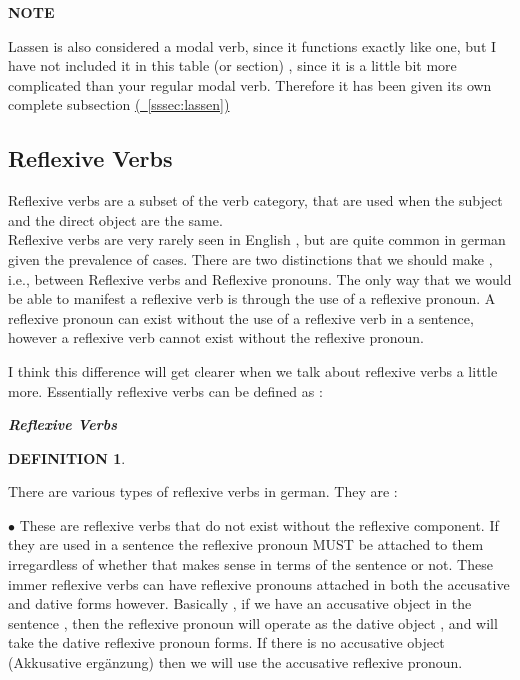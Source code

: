 \documentclass[a4paper,twocolumn,10pt]{article}
\newtheorem{mydef}{DEFINITION}[section]
\newcommand{\newpar}
{\par \vspace{0.3cm}}
\newcommand{\subsectionend}
{
\nolinenumbers
\linenumbers
}
\newcommand{\bulletpoint}
{ $\bullet$  }
\newcommand{\tcolorboxstart}
{
	\nolinenumbers
	\vspace{0.2cm}
	\centering
}
\newcommand{\tcolorboxend}
{
	\justifying
	\vspace{0.2cm}
	\linenumbers
}
\newcommand{\tcolorboxdefinition}[3]
{

\tcolorboxstart
\begin{defn-bg}

	\begin{defn-title}[width=7cm]{}
	{
		\normalsize \textbf{\textit{#1}}
	}
	\end{defn-title}

	\begin{defn-theword}
	{
		\footnotesize
		\begin{mydef} #2
		\end{mydef}
	}
	\end{defn-theword}


	\begin{defn-content}

	\justify
	#3

	\end{defn-content}

\end{defn-bg}
\tcolorboxend
}
\newcommand{\tcolorboxnote}[1]
{

\tcolorboxstart
\begin{note-bg}

	\begin{note-theword}
		{\footnotesize \textbf{NOTE} }
	\end{note-theword}

	\begin{note-content} \justifying

		#1

	\end{note-content}

\end{note-bg}
\tcolorboxend
}
\newcommand{\refsssec}[1]
{
	\hyperref[sec:#1]
	{
		(\textsection~\ref{sssec:#1})
	}
}
\begin{document}


\tcolorboxnote
{

Lassen is also considered a modal verb, since it functions exactly like one, but
I have not included it in this table (or section) , since it is a little bit
more complicated than your regular modal verb. Therefore it has been given its
own complete subsection \refsssec{lassen}

}




\subsectionend

\pagebreak

\subsection{Reflexive Verbs}
\label{ssec:reflexive_verbs}


Reflexive verbs are a subset of the verb category, that are used when the
subject and the direct object are the same.\\

Reflexive verbs are very rarely seen in English , but are quite common in
german given the prevalence of cases. There are two distinctions that we should
make , i.e., between Reflexive verbs and Reflexive pronouns. The only way that
we would be able to manifest a reflexive verb is through the use of a reflexive
pronoun. A reflexive pronoun can exist without the use of a reflexive verb in a
sentence, however a reflexive verb cannot exist without the reflexive
pronoun.\newpar

I think this difference will get clearer when we talk about reflexive verbs a
little more. Essentially reflexive verbs can be defined as :

\tcolorboxdefinition
{Reflexive Verbs}
{\label{def:reflexive_verbs}}
{



}


There are various types of reflexive verbs in german. They are :

\bulletpoint These are reflexive verbs that do not exist without the reflexive component. If
they are used in a sentence the reflexive pronoun MUST be attached to them
irregardless of whether that makes sense in terms of the sentence or not. These
immer reflexive verbs can have reflexive pronouns attached in both the
accusative and dative forms however.  Basically , if we have an accusative
object in the sentence , then the reflexive pronoun will operate as the dative
object , and will take the dative reflexive pronoun forms. If there is no
accusative object (Akkusative ergänzung) then we will use the accusative
reflexive pronoun.\newpar
\end{document}

